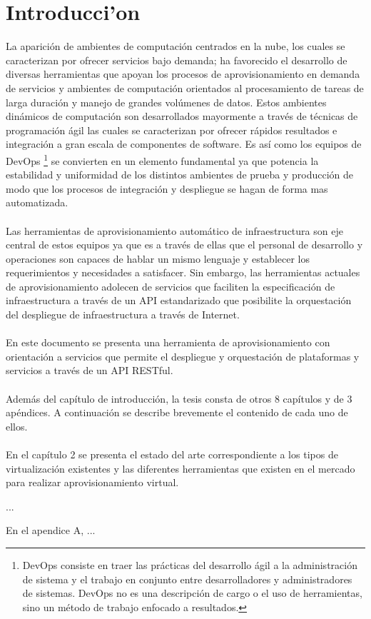\chapter{Introducci'on}

La aparición de ambientes de computación centrados en la nube, los cuales se caracterizan por ofrecer servicios bajo demanda; ha favorecido el desarrollo de diversas herramientas que apoyan los procesos de aprovisionamiento en demanda de servicios y ambientes de computación orientados al procesamiento de tareas de larga duración y manejo de grandes volúmenes de datos. Estos ambientes dinámicos de computación son desarrollados mayormente a través de técnicas de programación ágil las cuales se caracterizan por ofrecer rápidos resultados e integración a gran escala de componentes de software. Es así como los equipos de DevOps \footnote{DevOps consiste en traer las prácticas del desarrollo ágil a la administración de sistema y el trabajo en conjunto entre desarrolladores y administradores de sistemas. DevOps no es una descripción de cargo o el uso de herramientas, sino un método de trabajo enfocado a resultados.} se convierten en un elemento fundamental ya que potencia la estabilidad y uniformidad de los distintos ambientes de prueba y producción de modo que los procesos de integración y despliegue se hagan de forma mas automatizada. \\
\\
Las herramientas de aprovisionamiento automático de infraestructura son eje central de estos equipos ya que es a través de ellas que el personal de desarrollo y operaciones son capaces de hablar un mismo lenguaje y establecer los requerimientos y necesidades a satisfacer. Sin embargo, las herramientas actuales de aprovisionamiento adolecen de servicios que faciliten la especificación de infraestructura a través de un API estandarizado que posibilite la orquestación del despliegue de infraestructura a través de Internet.\\
\\
En este documento se presenta una herramienta de aprovisionamiento con orientación a servicios que permite el despliegue y orquestación de plataformas y servicios a través de un API RESTful.\\
\\
Además del capítulo de introducción, la tesis consta de otros 8 capítulos y de 3 apéndices. A continuación se describe brevemente el contenido de cada uno de ellos.\\
\\
En el capítulo 2 se presenta el estado del arte correspondiente a los tipos de virtualización existentes y las diferentes herramientas que existen en el mercado para realizar aprovisionamiento virtual.

...

En el apendice A, ...
